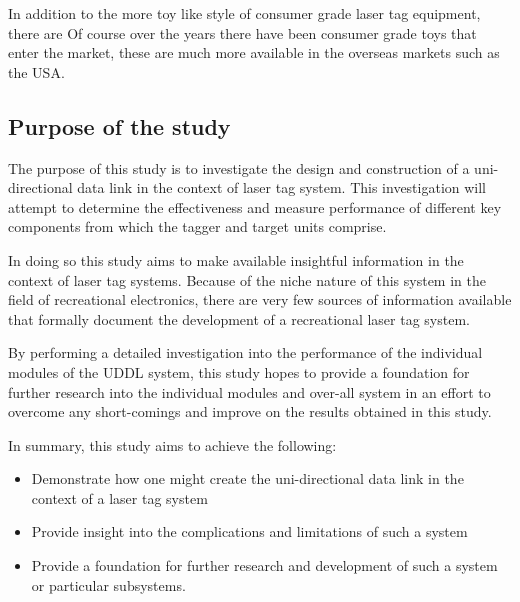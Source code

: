 In addition to the more toy like style of consumer grade laser tag equipment, there are  Of course over the years there have been consumer grade toys that enter the market, these are much more available in the overseas markets such as the USA.


\fi

\subsection{Purpose of the study}



The purpose of this study is to investigate the design and construction of a uni-directional data link in the context of laser tag system. This investigation will attempt to determine the effectiveness and measure performance of different key components from which the tagger and target units comprise.

In doing so this study aims to make available insightful information in the context of laser tag systems. Because of the niche nature of this system in the field of recreational electronics, there are very few sources of information available that formally document the development of a recreational laser tag system.

By performing a detailed investigation into the performance of the individual modules of the UDDL system, this study hopes to provide a foundation for further research into the individual modules and over-all system in an effort to overcome any short-comings and improve on the results obtained in this study.

In summary, this study aims to achieve the following:

\begin{itemize}
	\item Demonstrate how one might create the uni-directional data link in the context of a laser tag system
	\item Provide insight into the complications and limitations of such a system
	\item Provide a foundation for further research and development of such a system or particular subsystems.
\end{itemize}


